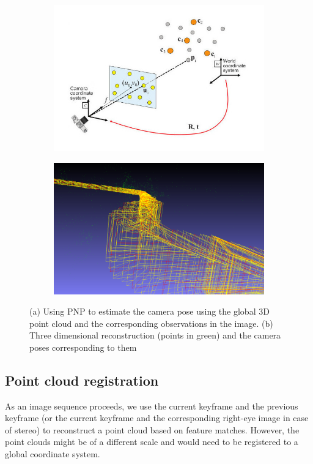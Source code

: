 \documentclass{article}
\begin{document}
\begin{figure}
    \centering
    \begin{subfigure}[b]{.45\linewidth}
        \includegraphics[width=\linewidth]{./pnp.jpg}
        \caption{}
        \label{fig:pnp}
    \end{subfigure}
    \begin{subfigure}[b]{.45\linewidth}
        \includegraphics[width=\linewidth]{./vo_stereo_7.png}
        \caption{}
        \label{fig:recon}
    \end{subfigure}
    \caption{(a) Using PNP to estimate the camera pose using the global 3D point cloud and the corresponding observations in the image. (b) Three dimensional reconstruction (points in green) and the camera poses corresponding to them}
\end{figure}

\subsection{Point cloud registration}
As an image sequence proceeds, we use the current keyframe and the previous keyframe (or the current keyframe and the corresponding right-eye image in case of stereo) to reconstruct a point cloud based on feature matches. However, the point clouds might be of a different scale and would need to be registered to a global coordinate system.
\end{document}

